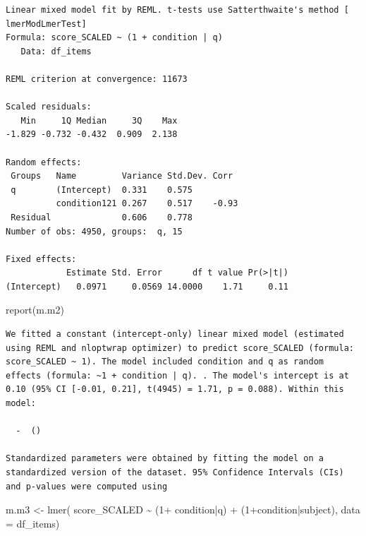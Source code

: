 \documentclass[
  letterpaper,
  DIV=11,
  numbers=noendperiod]{scrreprt}
\newenvironment{Shaded}{\begin{snugshade}}{\end{snugshade}}
\newcommand{\AttributeTok}[1]{\textcolor[rgb]{0.40,0.45,0.13}{#1}}
\newcommand{\DecValTok}[1]{\textcolor[rgb]{0.68,0.00,0.00}{#1}}
\newcommand{\FunctionTok}[1]{\textcolor[rgb]{0.28,0.35,0.67}{#1}}
\newcommand{\NormalTok}[1]{\textcolor[rgb]{0.00,0.23,0.31}{#1}}
\newcommand{\OtherTok}[1]{\textcolor[rgb]{0.00,0.23,0.31}{#1}}
\newcommand{\SpecialCharTok}[1]{\textcolor[rgb]{0.37,0.37,0.37}{#1}}
\begin{document}
\begin{verbatim}
Linear mixed model fit by REML. t-tests use Satterthwaite's method [
lmerModLmerTest]
Formula: score_SCALED ~ (1 + condition | q)
   Data: df_items

REML criterion at convergence: 11673

Scaled residuals: 
   Min     1Q Median     3Q    Max 
-1.829 -0.732 -0.432  0.909  2.138 

Random effects:
 Groups   Name         Variance Std.Dev. Corr 
 q        (Intercept)  0.331    0.575         
          condition121 0.267    0.517    -0.93
 Residual              0.606    0.778         
Number of obs: 4950, groups:  q, 15

Fixed effects:
            Estimate Std. Error      df t value Pr(>|t|)
(Intercept)   0.0971     0.0569 14.0000    1.71     0.11
\end{verbatim}

\begin{Shaded}
\begin{Highlighting}[]
\FunctionTok{report}\NormalTok{(m.m2)}
\end{Highlighting}
\end{Shaded}

\begin{verbatim}
We fitted a constant (intercept-only) linear mixed model (estimated using REML and nloptwrap optimizer) to predict score_SCALED (formula: score_SCALED ~ 1). The model included condition and q as random effects (formula: ~1 + condition | q). . The model's intercept is at 0.10 (95% CI [-0.01, 0.21], t(4945) = 1.71, p = 0.088). Within this model:

  -  ()

Standardized parameters were obtained by fitting the model on a standardized version of the dataset. 95% Confidence Intervals (CIs) and p-values were computed using 
\end{verbatim}

\begin{Shaded}
\begin{Highlighting}[]
\NormalTok{m.m3 }\OtherTok{\textless{}{-}} \FunctionTok{lmer}\NormalTok{( score\_SCALED }\SpecialCharTok{\textasciitilde{}}\NormalTok{ (}\DecValTok{1}\SpecialCharTok{+}\NormalTok{ condition}\SpecialCharTok{|}\NormalTok{q) }\SpecialCharTok{+}\NormalTok{ (}\DecValTok{1}\SpecialCharTok{+}\NormalTok{condition}\SpecialCharTok{|}\NormalTok{subject), }\AttributeTok{data =}\NormalTok{ df\_items)}
\end{Highlighting}
\end{Shaded}
\end{document}
